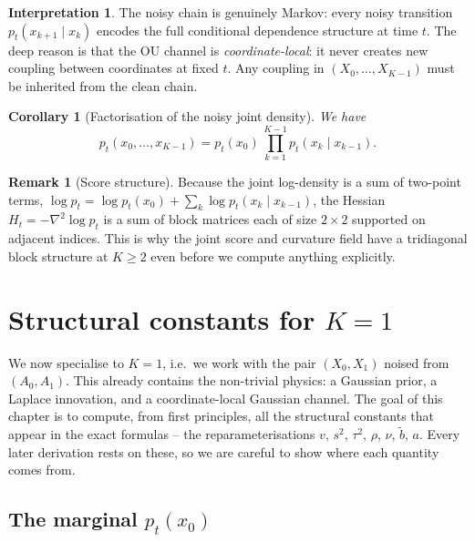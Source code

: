 \documentclass[11pt,a4paper,openany]{book}
\theoremstyle{plainserif}
\newtheorem{corollary}[theorem]{Corollary}
\theoremstyle{definition}
\theoremstyle{remarkstyle}
\newtheorem*{remark}{Remark}
\newtheorem*{interpretation}{Interpretation}
\newcommand{\btilde}{\tilde{b}}
\begin{document}
\begin{interpretation}
The noisy chain is genuinely Markov: every noisy transition
$p_t(x_{k+1} \mid x_k)$ encodes the full conditional dependence structure
at time $t$. The deep reason is that the OU channel is
\emph{coordinate-local}: it never creates new coupling between coordinates
at fixed $t$. Any coupling in $(X_0, \ldots, X_{K-1})$ must be inherited
from the clean chain.
\end{interpretation}

\begin{corollary}[Factorisation of the noisy joint density]
\label{cor:noisy-factor}
We have
\begin{equation}
p_t(x_0, \ldots, x_{K-1}) = p_t(x_0)\, \prod_{k=1}^{K-1} p_t(x_k \mid x_{k-1}).
\label{eq:noisy-factor}
\end{equation}
\end{corollary}

\begin{remark}[Score structure]
Because the joint log-density is a sum of two-point terms,
$\log p_t = \log p_t(x_0) + \sum_{k} \log p_t(x_k \mid x_{k-1})$,
the Hessian $H_t = -\nabla^2 \log p_t$ is a sum of block matrices each of
size $2\times 2$ supported on adjacent indices. This is why the joint
score and curvature field have a tridiagonal block structure at $K\geq 2$
even before we compute anything explicitly.
\end{remark}

\chapter{Structural constants for $K=1$}
\label{ch:constants}

We now specialise to $K=1$, i.e.\ we work with the pair $(X_0, X_1)$ noised
from $(A_0, A_1)$. This already contains the non-trivial physics: a Gaussian
prior, a Laplace innovation, and a coordinate-local Gaussian channel.
The goal of this chapter is to compute, from first principles, all the
structural constants that appear in the exact formulas -- the
reparameterisations $v$, $s^2$, $\tau^2$, $\rho$, $\nu$, $\btilde$, $a$.
Every later derivation rests on these, so we are careful to show where
each quantity comes from.

\section{The marginal $p_t(x_0)$}
\end{document}
